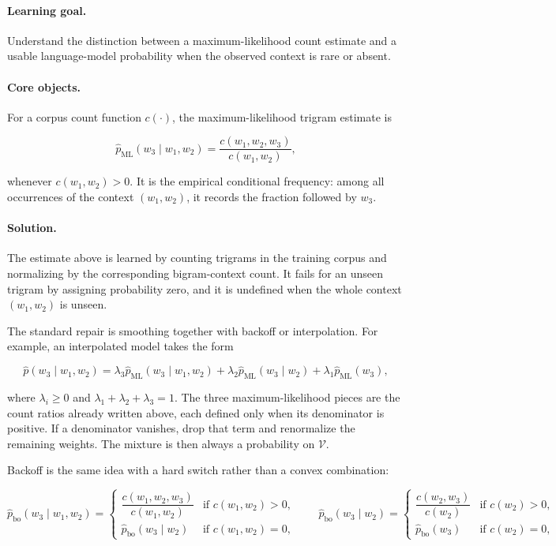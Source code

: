 \documentclass[11pt,a4paper]{article}
\theoremstyle{definition}
\begin{document}
\paragraph{Learning goal.}
Understand the distinction between a maximum-likelihood count estimate and a usable language-model probability when the observed context is rare or absent.

\paragraph{Core objects.}
For a corpus count function $c(\cdot)$, the maximum-likelihood trigram estimate is

\[
\widehat p_{\mathrm{ML}}(w_3\mid w_1,w_2)
= \frac{c(w_1,w_2,w_3)}{c(w_1,w_2)},
\]

whenever $c(w_1,w_2)>0$. It is the empirical conditional frequency: among all occurrences of the context $(w_1,w_2)$, it records the fraction followed by $w_3$.

\paragraph{Solution.}
The estimate above is learned by counting trigrams in the training corpus and normalizing by the corresponding bigram-context count. It fails for an unseen trigram by assigning probability zero, and it is undefined when the whole context $(w_1,w_2)$ is unseen.

The standard repair is smoothing together with backoff or interpolation. For example, an interpolated model takes the form

\[
\widehat p(w_3\mid w_1,w_2)
= \lambda_3\widehat p_{\mathrm{ML}}(w_3\mid w_1,w_2)
+ \lambda_2\widehat p_{\mathrm{ML}}(w_3\mid w_2)
+ \lambda_1\widehat p_{\mathrm{ML}}(w_3),
\]

where \(\lambda_i\geq 0\) and \(\lambda_1+\lambda_2+\lambda_3=1\). The three maximum-likelihood pieces are the count ratios already written above, each defined only when its denominator is positive. If a denominator vanishes, drop that term and renormalize the remaining weights. The mixture is then always a probability on \(\mathcal{V}\).

Backoff is the same idea with a hard switch rather than a convex combination:

\[
\widehat p_{\mathrm{bo}}(w_3\mid w_1,w_2)
=
\begin{cases}
\dfrac{c(w_1,w_2,w_3)}{c(w_1,w_2)}
  & \text{if }c(w_1,w_2)>0,\\[6pt]
\widehat p_{\mathrm{bo}}(w_3\mid w_2)
  & \text{if }c(w_1,w_2)=0,
\end{cases}
\qquad
\widehat p_{\mathrm{bo}}(w_3\mid w_2)
=
\begin{cases}
\dfrac{c(w_2,w_3)}{c(w_2)}
  & \text{if }c(w_2)>0,\\[6pt]
\widehat p_{\mathrm{bo}}(w_3)
  & \text{if }c(w_2)=0,
\end{cases}
\]
\end{document}
